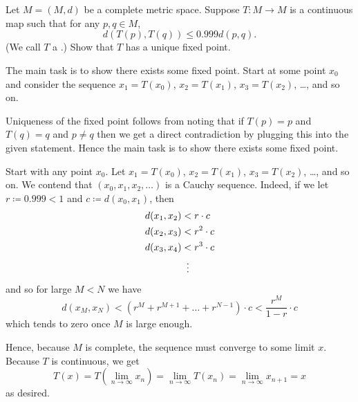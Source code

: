 \section{\problemhead}
\begin{dproblem}
	Let $M = (M,d)$ be a complete metric space.
	Suppose $T \colon M \to M$ is a continuous map
	such that for any $p, q \in M$,
	\[ d\left( T(p), T(q) \right) \le 0.999 d(p,q). \]
	(We call $T$ a .)
	Show that $T$ has a unique fixed point.
	\begin{hint}
		The main task is to show there exists some fixed point.
		Start at some point $x_0$ and consider the sequence
		$x_1 = T(x_0)$, $x_2 = T(x_1)$, $x_3 = T(x_2)$, \dots, and so on.
	\end{hint}
	\begin{sol}
		Uniqueness of the fixed point follows from noting that if $T(p) = p$ and $T(q) = q$
		and $p \neq q$ then we get a direct contradiction by plugging this into the given statement.
		Hence the main task is to show there exists some fixed point.

		Start with any point $x_0$.
		Let $x_1 = T(x_0)$, $x_2 = T(x_1)$, $x_3 = T(x_2)$, \dots, and so on.
		We contend that $(x_0, x_1, x_2, \dots)$ is a Cauchy sequence.
		Indeed, if we let $r \coloneqq 0.999 < 1$ and $c \coloneqq d(x_0, x_1)$, then
		\begin{align*}
			d(x_1, x_2) &< r \cdot c \\
			d(x_2, x_3) &< r^2 \cdot c \\
			d(x_3, x_4) &< r^3 \cdot c \\
			&\vdotswithin< \\
		\end{align*}
		and so for large $M < N$ we have
		\[ d(x_M, x_N) < \left( r^M + r^{M+1} + \dots + r^{N-1} \right) \cdot c
			< \frac{r^M}{1-r} \cdot c
		\]
		which tends to zero once $M$ is large enough.

		Hence, because $M$ is complete, the sequence must converge to some limit $x$.
		Because $T$ is continuous, we get
		\[ T(x) = T\left( \lim_{n \to \infty} x_n \right)
			= \lim_{n \to \infty} T(x_n)
			= \lim_{n \to \infty} x_{n+1} = x \]
		as desired.
	\end{sol}
\end{dproblem}

